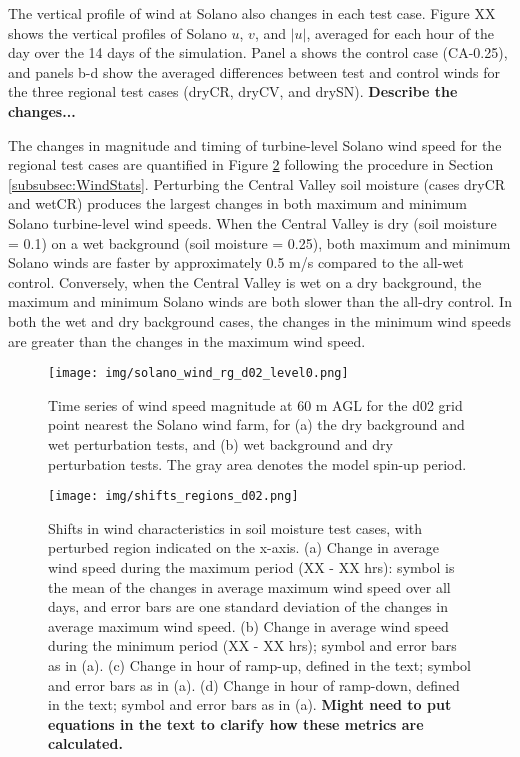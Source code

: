The vertical profile of wind at Solano also changes in each test case.  Figure XX shows the vertical profiles of Solano $u$, $v$, and $|u|$, averaged for each hour of the day over the 14 days of the simulation.  Panel a shows the control case (CA-0.25), and panels b-d show the averaged differences between test and control winds for the three regional test cases (dryCR, dryCV, and drySN).  \textbf{Describe the changes...}

The changes in magnitude and timing of turbine-level Solano wind speed for the regional test cases are quantified in Figure \ref{fig:windSol_WindShiftsRg} following the procedure in Section \ref{subsubsec:WindStats}.  Perturbing the Central Valley soil moisture (cases dryCR and wetCR) produces the largest changes in both maximum and minimum Solano turbine-level wind speeds.  When the Central Valley is dry (soil moisture = 0.1) on a wet background (soil moisture = 0.25), both maximum and minimum Solano winds are faster by approximately 0.5 m/s compared to the all-wet control.  Conversely, when the Central Valley is wet on a dry background, the maximum and minimum Solano winds are both slower than the all-dry control.  In both the wet and dry background cases, the changes in the minimum wind speeds are greater than the changes in the maximum wind speed.

\begin{figure}[here]
\texttt{[image: img/solano\_wind\_rg\_d02\_level0.png]}
\caption{Time series of wind speed magnitude at 60 m AGL for the d02 grid point nearest the Solano wind farm, for (a) the dry background and wet perturbation tests, and (b) wet background and dry perturbation tests.  The gray area denotes the model spin-up period.}
\label{fig:windSol_TseriesWindRg}
\end{figure}

\begin{figure}[here]
\texttt{[image: img/shifts\_regions\_d02.png]}
\caption{Shifts in wind characteristics in soil moisture test cases, with perturbed region indicated on the x-axis.  (a) Change in average wind speed during the maximum period (XX - XX hrs): symbol is the mean of the changes in average maximum wind speed over all days, and error bars are one standard deviation of the changes in average maximum wind speed.  (b) Change in average wind speed during the minimum period (XX - XX hrs); symbol and error bars as in (a).  (c) Change in hour of ramp-up, defined in the text; symbol and error bars as in (a).  (d) Change in hour of ramp-down, defined in the text; symbol and error bars as in (a).  \textbf{Might need to put equations in the text to clarify how these metrics are calculated.}}
\label{fig:windSol_WindShiftsRg}
\end{figure}

